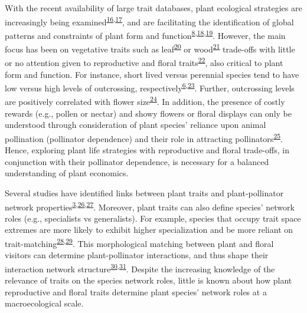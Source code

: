 \documentclass[12pt,a4paper,]{article}
\begin{document}
With the recent availability of large trait databases, plant ecological
strategies are increasingly being
examined\textsuperscript{\protect\hyperlink{ref-kattge2011}{16},\protect\hyperlink{ref-salguero2015}{17}},
and are facilitating the identification of global patterns and
constraints of plant form and
function\textsuperscript{\protect\hyperlink{ref-salguero2016}{8},\protect\hyperlink{ref-diaz2016}{18},\protect\hyperlink{ref-carmona2021}{19}}.
However, the main focus has been on vegetative traits such as
leaf\textsuperscript{\protect\hyperlink{ref-wright2004}{20}} or
wood\textsuperscript{\protect\hyperlink{ref-chave2009}{21}} trade-offs
with little or no attention given to reproductive and floral
traits\textsuperscript{\protect\hyperlink{ref-evojtko2020}{22}}, also
critical to plant form and function. For instance, short lived versus
perennial species tend to have low versus high levels of outcrossing,
respectively\textsuperscript{\protect\hyperlink{ref-moeller2017}{6},\protect\hyperlink{ref-barrett2003}{23}}.
Further, outcrossing levels are positively correlated with flower
size\textsuperscript{\protect\hyperlink{ref-goodwillie2010}{24}}. In
addition, the presence of costly rewards (e.g., pollen or nectar) and
showy flowers or floral displays can only be understood through
consideration of plant species' reliance upon animal pollination
(pollinator dependence) and their role in attracting
pollinators\textsuperscript{\protect\hyperlink{ref-ollerton2011}{25}}.
Hence, exploring plant life strategies with reproductive and floral
trade-offs, in conjunction with their pollinator dependence, is
necessary for a balanced understanding of plant economics.

Several studies have identified links between plant traits and
plant-pollinator network
properties\textsuperscript{\protect\hyperlink{ref-carvalheiro2014}{3},\protect\hyperlink{ref-lazaro2008}{26},\protect\hyperlink{ref-bartomeus2013}{27}}.
Moreover, plant traits can also define species' network roles (e.g.,
specialists vs generalists). For example, species that occupy trait
space extremes are more likely to exhibit higher specialization and be
more reliant on
trait-matching\textsuperscript{\protect\hyperlink{ref-junker2013}{28},\protect\hyperlink{ref-coux2016}{29}}.
This morphological matching between plant and floral visitors can
determine plant-pollinator interactions, and thus shape their
interaction network
structure\textsuperscript{\protect\hyperlink{ref-stang2009}{30},\protect\hyperlink{ref-ibanez2012}{31}}.
Despite the increasing knowledge of the relevance of traits on the
species network roles, little is known about how plant reproductive and
floral traits determine plant species' network roles at a
macroecological scale.
\end{document}
